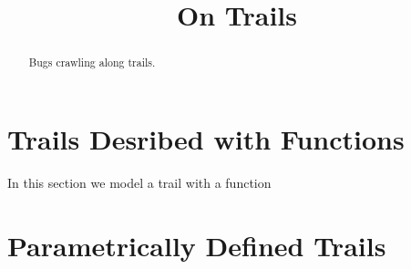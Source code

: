 \documentclass{ximera}
\title{On Trails}
\begin{document}
\begin{abstract}
Bugs crawling along trails.
\end{abstract}
\maketitle

\section{Trails Desribed with Functions}

In this section we model a trail with a function




\section{Parametrically Defined Trails}
\end{document}
